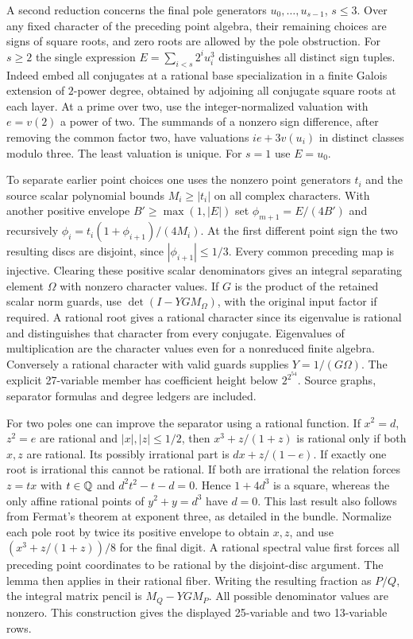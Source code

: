 A second reduction concerns the final pole generators $u_0,\ldots,u_{s-1}$, $s\le3$. Over any fixed character of the preceding point algebra, their remaining choices are signs of square roots, and zero roots are allowed by the pole obstruction. For $s\ge2$ the single expression $E=\sum_{i<s}2^i u_i^3$ distinguishes all distinct sign tuples. Indeed embed all conjugates at a rational base specialization in a finite Galois extension of $2$-power degree, obtained by adjoining all conjugate square roots at each layer. At a prime over two, use the integer-normalized valuation with $e=v(2)$ a power of two. The summands of a nonzero sign difference, after removing the common factor two, have valuations $ie+3v(u_i)$ in distinct classes modulo three. The least valuation is unique. For $s=1$ use $E=u_0$.

To separate earlier point choices one uses the nonzero point generators $t_i$ and the source scalar polynomial bounds $M_i\ge |t_i|$ on all complex characters. With another positive envelope $B'\ge\max(1,|E|)$ set $\phi_{m+1}=E/(4B')$ and recursively $\phi_i=t_i(1+\phi_{i+1})/(4M_i)$. At the first different point sign the two resulting discs are disjoint, since $|\phi_{i+1}|\le1/3$. Every common preceding map is injective. Clearing these positive scalar denominators gives an integral separating element $\Omega$ with nonzero character values. If $G$ is the product of the retained scalar norm guards, use $\det(I-YG M_\Omega)$, with the original input factor if required. A rational root gives a rational character since its eigenvalue is rational and distinguishes that character from every conjugate. Eigenvalues of multiplication are the character values even for a nonreduced finite algebra. Conversely a rational character with valid guards supplies $Y=1/(G\Omega)$. The explicit 27-variable member has coefficient height below $2^{2^{54}}$. Source graphs, separator formulas and degree ledgers are included.

For two poles one can improve the separator using a rational function. If $x^2=d$, $z^2=e$ are rational and $|x|,|z|\le1/2$, then $x^3+z/(1+z)$ is rational only if both $x,z$ are rational. Its possibly irrational part is $dx+z/(1-e)$. If exactly one root is irrational this cannot be rational. If both are irrational the relation forces $z=tx$ with $t\in\mathbb Q$ and $d^2t^2-t-d=0$. Hence $1+4d^3$ is a square, whereas the only affine rational points of $y^2+y=d^3$ have $d=0$. This last result also follows from Fermat's theorem at exponent three, as detailed in the bundle. Normalize each pole root by twice its positive envelope to obtain $x,z$, and use $(x^3+z/(1+z))/8$ for the final digit. A rational spectral value first forces all preceding point coordinates to be rational by the disjoint-disc argument. The lemma then applies in their rational fiber. Writing the resulting fraction as $P/Q$, the integral matrix pencil is $M_Q-YG M_P$. All possible denominator values are nonzero. This construction gives the displayed 25-variable and two 13-variable rows.
